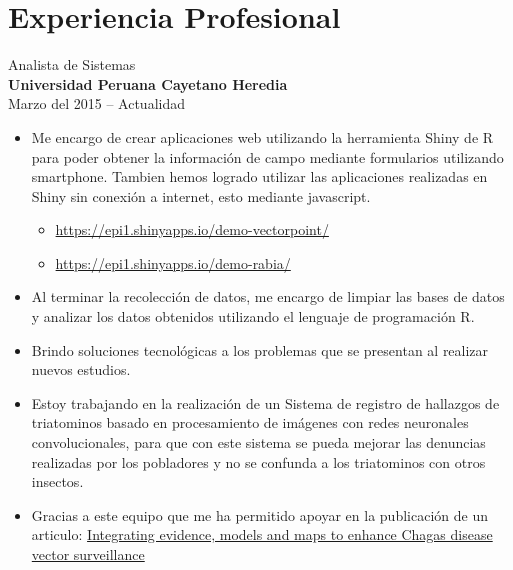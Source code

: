 \documentclass[letterpaper]{twentysecondcv} %
\begin{document}
\begin{twentyshort} %
	
\end{twentyshort}


\section{Experiencia Profesional}

{\Large Analista de Sistemas}\\
{\large \bf Universidad Peruana Cayetano Heredia}\\
{Marzo del 2015 -- Actualidad}
\begin{itemize}
\item Me encargo de crear aplicaciones web utilizando la herramienta Shiny de R para poder obtener la información de campo mediante formularios utilizando smartphone. Tambien hemos logrado utilizar las aplicaciones realizadas en Shiny sin conexión a internet, esto mediante javascript.
  \begin{itemize}
	\item {\url{https://epi1.shinyapps.io/demo-vectorpoint/}}
	\item {\url{https://epi1.shinyapps.io/demo-rabia/}}\\
  \end{itemize}
\item Al terminar la recolección de datos, me encargo de limpiar las bases de datos y analizar los datos obtenidos utilizando el lenguaje de programación R.
\item Brindo soluciones tecnológicas a los problemas que se presentan al realizar nuevos estudios.
\item Estoy trabajando en la realización de un Sistema de registro de hallazgos de triatominos basado en procesamiento de imágenes con redes neuronales convolucionales, para que con este sistema se pueda mejorar las denuncias realizadas por los pobladores y no se confunda a los triatominos con otros insectos.
\item Gracias a este equipo que me ha permitido apoyar en la publicación de un articulo: \href{https://journals.plos.org/plosntds/article?id=10.1371/journal.pntd.0006883}{Integrating evidence, models and maps to enhance Chagas disease vector surveillance}\\
\end{itemize}
\end{document}
